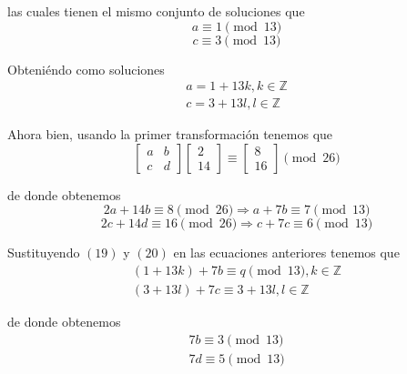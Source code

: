 \documentclass[letterpaper,11pt]{article}
\begin{document}
\begin{enumerate}
\begin{enumerate}
        las cuales tienen el mismo conjunto de soluciones que
        \begin{equation*}
            a \equiv 1 \pmod{13}
        \end{equation*}
        \begin{equation*}
            c \equiv 3 \pmod{13}
        \end{equation*}
        
        Obteniéndo como soluciones
        \begin{align}
            a = 1 + 13k, k \in \mathbb{Z} \\
            c = 3 + 13l, l \in \mathbb{Z}
        \end{align}
        
        Ahora bien, usando la primer transformación tenemos que 
        \begin{equation*}
            \begin{bmatrix} a & b \\ c & d \end{bmatrix}
            \begin{bmatrix} 2 \\ 14 \end{bmatrix} \equiv
            \begin{bmatrix} 8 \\ 16 \end{bmatrix} \pmod{26}
        \end{equation*}
        
        de donde obtenemos
        \begin{equation*}
            2a + 14b \equiv 8 \pmod{26} \Rightarrow a + 7b \equiv 7 \pmod{13}
        \end{equation*}
        \begin{equation*}
            2c + 14d \equiv 16 \pmod{26} \Rightarrow c + 7c \equiv 6 \pmod{13}
        \end{equation*}

        Sustituyendo $(19)$ y $(20)$ en las ecuaciones anteriores tenemos que 
        \begin{align*}
            (1 + 13k) + 7b \equiv q \pmod{13}, k \in \mathbb{Z} \\
            (3 + 13l) + 7c \equiv 3 + 13l, l \in \mathbb{Z}
        \end{align*}
        
        de donde obtenemos 
        \begin{align*}
            7b \equiv 3 \pmod{13} \\
            7d \equiv 5 \pmod{13}
        \end{align*}
        

\end{enumerate}
\end{enumerate}
\end{document}
